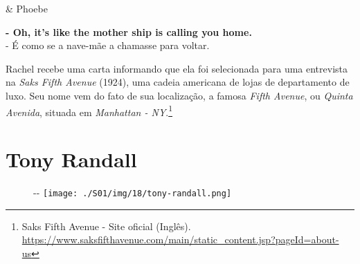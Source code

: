 \begin{tcolorbox}[enhanced,center upper,
    drop fuzzy shadow southeast, boxrule=0.3pt,
    lower separated=false, breakable,
    colframe=black!30!dialogoBorder,colback=white]
\medskip
\begin{minipage}[c]{0.16\linewidth}
   & \centering \scriptsize{Phoebe}
\end{minipage}
\hfill
\begin{minipage}[c]{0.8\linewidth}
  \textbf{- Oh, it's like the mother ship is calling you home.}\\
  - É como se a nave-mãe a chamasse para voltar.
\end{minipage}
\end{tcolorbox}

Rachel recebe uma carta informando que ela foi selecionada para uma
entrevista na \emph{Saks Fifth Avenue} (1924), uma cadeia americana de
lojas de departamento de luxo. Seu nome vem do fato de sua localização,
a famosa \emph{Fifth Avenue}, ou \emph{Quinta Avenida}, situada em
\emph{Manhattan - NY}.\footnote{\sloppy Saks Fifth Avenue - Site oficial (Inglês). \url{https://www.saksfifthavenue.com/main/static_content.jsp?pageId=about-us}}

\hypertarget{tony-randall}{%
\section{Tony Randall}\label{tony-randall}}

\begin{figure}[!ht]
  \begin{adjustwidth}{-\oddsidemargin-1in}{-\rightmargin}
    \centering
    \texttt{[image: ./S01/img/18/tony-randall.png]}
  \end{adjustwidth}
\end{figure}

